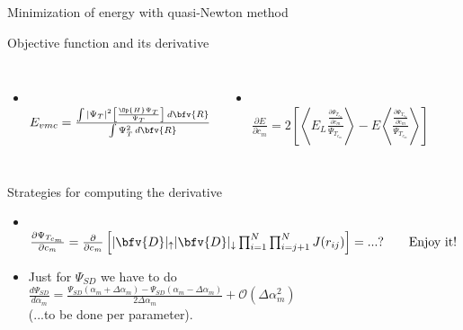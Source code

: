 \begin{frame}{Minimization of energy with quasi-Newton method}
	\begin{scriptsize}
		\begin{alertblock}{Objective function and its derivative}
			\begin{columns}
			\column{4.0cm}
				\begin{itemize}
					\item {\color{red}{Expectation value of the energy:}}\\
					$E_{vmc} = \frac{ \int |\Psi_{T}|^2 \left[\frac{\Op{H} \Psi_{T}}{\Psi_{T}}\right]\, d\bfv{R}}{\int \Psi_{T}^2 \, d\bfv{R}}$
				\end{itemize}
				 
				 \column{6.0cm}
				 \begin{itemize}			 
					\item {\color{red}{Derivative of the expectation value of the energy:}}\\
					$\frac{\partial E}{\partial c_m} = 2\left[\left\langle E_L \frac{\frac{\partial \Psi_{T_{c_m}}}{\partial c_m}}{\Psi_{T_{c_m}}}\right\rangle - E \left\langle \frac{\frac{\partial \Psi_{T_{c_m}}}{\partial c_m}}{\Psi_{T_{c_m}}}\right\rangle \right]$
				 \end{itemize}
				\end{columns}
			\end{alertblock}
		\end{scriptsize}
		
		
		
	\begin{scriptsize}
		\begin{alertblock}{Strategies for computing the derivative}
			
				\begin{itemize}
					\item {\color{red}{Direct analytical differentiation:}}\\
					\vspace{0.2cm}
					$\frac{\partial \Psi_{T_{c_m}}}{\partial c_m} = \frac{\partial}{\partial c_m}\left[|\bfv{D}|_{\uparrow} |\bfv{D}|_{\downarrow} \prod_{i=1}^{N} \prod_{i=j+1}^{N} J(r_{ij})\right] = ...? \qquad \text{Enjoy it!}$
					\vspace{0.2cm}
					\item {\color{red}{Numerical derivative: central differences:}} Just for $\Psi_{SD}$ we have to do\\
					\vspace{0.2cm}
						$\frac{d \Psi_{SD}}{d \alpha_m} = \frac{\Psi_{SD}(\alpha_m + \Delta \alpha_m) - \Psi_{SD}(\alpha_m - \Delta \alpha_m)}{2\Delta \alpha_m} + \mathcal{O}(\Delta \alpha_{m}^2)$ \\
						\vspace{0.2cm}
						(...to be done per parameter).
						\vspace{0.2cm}
				\end{itemize}
				
			\end{alertblock}
		\end{scriptsize}
\end{frame}


